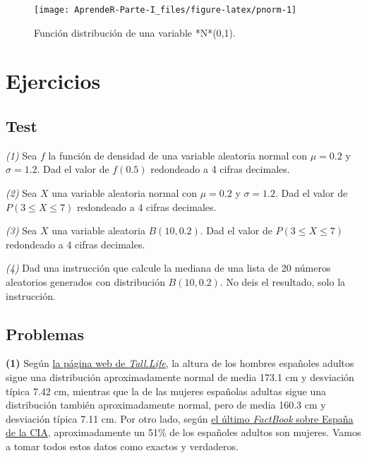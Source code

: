 \documentclass[]{book}
\theoremstyle{definition}
\theoremstyle{definition}
\theoremstyle{definition}
\theoremstyle{remark}
\begin{document}
\begin{figure}

{\centering \texttt{[image: AprendeR-Parte-I\_files/figure-latex/pnorm-1]} 

}

\caption{Función distribución de una variable *N*(0,1).}\label{fig:pnorm}
\end{figure}

\hypertarget{ejercicios-7}{%
\section{Ejercicios}\label{ejercicios-7}}

\hypertarget{test-6}{%
\subsection*{Test}\label{test-6}}

\emph{(1)} Sea \(f\) la función de densidad de una variable aleatoria normal con \(\mu=0.2\) y \(\sigma=1.2\). Dad el valor de \(f(0.5)\) redondeado a 4 cifras decimales.

\emph{(2)} Sea \(X\) una variable aleatoria normal con \(\mu=0.2\) y \(\sigma=1.2\). Dad el valor de \(P(3\leqslant X\leqslant 7)\) redondeado a 4 cifras decimales.

\emph{(3)} Sea \(X\) una variable aleatoria \(B(10,0.2)\). Dad el valor de \(P(3\leqslant X\leqslant 7)\) redondeado a 4 cifras decimales.

\emph{(4)} Dad una instrucción que calcule la mediana de una lista de 20 números aleatorios generados con distribución \(B(10,0.2)\). No deis el resultado, solo la instrucción.

\hypertarget{problemas}{%
\subsection*{Problemas}\label{problemas}}

\textbf{(1)} Según \href{https://tall.life/height-percentile-calculator-age-country/}{la página web de \emph{Tall.Life}}, la altura de los hombres españoles adultos sigue una distribución aproximadamente normal de media 173.1 cm y desviación típica 7.42 cm, mientras que la de las mujeres españolas adultas sigue una distribución también aproximadamente normal, pero de media 160.3 cm y desviación típica 7.11 cm.
Por otro lado, según \href{https://www.cia.gov/library/publications/the-world-factbook/geos/sp.html}{el último \emph{FactBook} sobre España de la CIA}, aproximadamente un 51\% de los españoles adultos son mujeres. Vamos a tomar todos estos datos como exactos y verdaderos.
\end{document}
